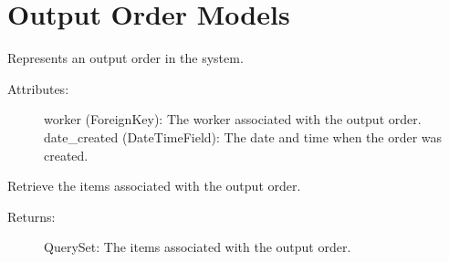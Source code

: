 \documentclass[letterpaper,10pt,english]{sphinxmanual}
\begin{document}
\chapter{Output Order Models}
\label{\detokenize{modules/models:module-OutputHistory.models}}\label{\detokenize{modules/models:output-order-models}}

\begin{fulllineitems}
\label{\detokenize{modules/models:OutputHistory.models.OutputOrder}}
\sphinxAtStartPar
Represents an output order in the system.
\begin{description}
\item[{Attributes:}] \leavevmode
\sphinxAtStartPar
worker (ForeignKey): The worker associated with the output order.
date\_created (DateTimeField): The date and time when the order was created.

\end{description}

\begin{fulllineitems}
\label{\detokenize{modules/models:OutputHistory.models.OutputOrder.DoesNotExist}}
\end{fulllineitems}


\begin{fulllineitems}
\label{\detokenize{modules/models:OutputHistory.models.OutputOrder.GetItems}}
\sphinxAtStartPar
Retrieve the items associated with the output order.
\begin{description}
\item[{Returns:}] \leavevmode
\sphinxAtStartPar
QuerySet: The items associated with the output order.


\end{description}
\end{fulllineitems}
\end{fulllineitems}
\end{document}
